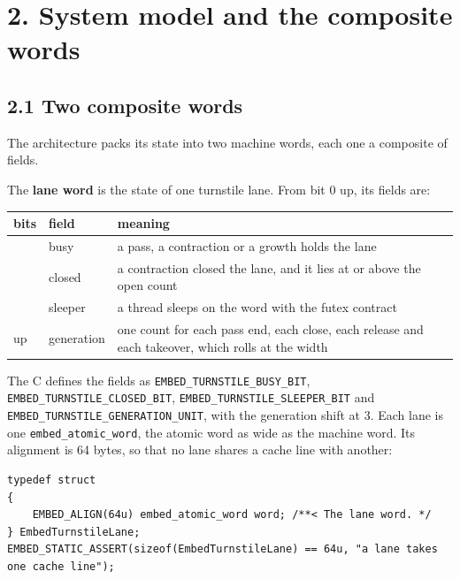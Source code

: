 \section{\texorpdfstring{2. System model and the composite words}{2. System model and the composite words}}

\subsection{\texorpdfstring{2.1 Two composite words}{2.1 Two composite words}}

The architecture packs its state into two machine words, each one a composite of fields.

The \textbf{lane word} is the state of one turnstile lane. From bit 0 up, its fields are:

{\small
\setlength{\tabcolsep}{6pt}
\begin{longtable}{>{\RaggedRight\arraybackslash}p{}>{\RaggedRight\arraybackslash}p{}>{\RaggedRight\arraybackslash}p{}}
\toprule
bits & field & meaning \\
\midrule
\endhead
0 & busy & a pass, a contraction or a growth holds the lane \\
1 & closed & a contraction closed the lane, and it lies at or above the open count \\
2 & sleeper & a thread sleeps on the word with the futex contract \\
3 up & generation & one count for each pass end, each close, each release and each takeover, which rolls at the width \\
\bottomrule
\end{longtable}
}

The C defines the fields as \texttt{EMBED\_\allowbreak{}TURNSTILE\_\allowbreak{}BUSY\_\allowbreak{}BIT}, \texttt{EMBED\_\allowbreak{}TURNSTILE\_\allowbreak{}CLOSED\_\allowbreak{}BIT}, \texttt{EMBED\_\allowbreak{}TURNSTILE\_\allowbreak{}SLEEPER\_\allowbreak{}BIT} and \texttt{EMBED\_\allowbreak{}TURNSTILE\_\allowbreak{}GENERATION\_\allowbreak{}UNIT}, with the generation shift at 3. Each lane is one \texttt{embed\_\allowbreak{}atomic\_\allowbreak{}word}, the atomic word as wide as the machine word. Its alignment is 64 bytes, so that no lane shares a cache line with another:

\begin{Verbatim}
typedef struct
{
    EMBED_ALIGN(64u) embed_atomic_word word; /**< The lane word. */
} EmbedTurnstileLane;
EMBED_STATIC_ASSERT(sizeof(EmbedTurnstileLane) == 64u, "a lane takes one cache line");
\end{Verbatim}

